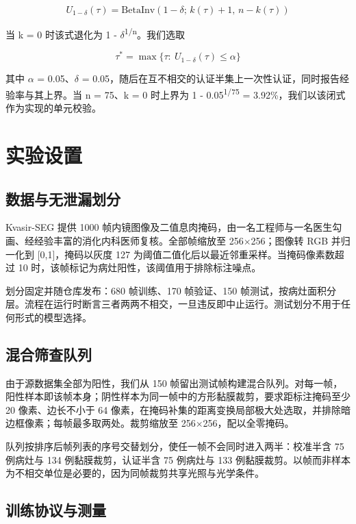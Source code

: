 \documentclass[conference]{IEEEtran}
\begin{document}
\begin{equation}
U_{1-\delta}(\tau)=\mathrm{BetaInv}\!\left(1-\delta;\,k(\tau)+1,\,n-k(\tau)\right)
\end{equation}

当 k = 0 时该式退化为 1 - $\delta$\textsuperscript{1/n}\cite{clopper1934}。我们选取

\begin{equation}
\tau^{*}=\max\{\tau:\ U_{1-\delta}(\tau)\le\alpha\}
\end{equation}

其中 $\alpha$ = 0.05、$\delta$ = 0.05，随后在互不相交的认证半集上一次性认证，同时报告经验率与其上界。当 n = 75、k = 0 时上界为 1 - 0.05\textsuperscript{1/75} = 3.92\%，我们以该闭式作为实现的单元校验。

\section{实验设置}

\subsection{数据与无泄漏划分}

Kvasir-SEG 提供 1000 帧内镜图像及二值息肉掩码，由一名工程师与一名医生勾画、经经验丰富的消化内科医师复核\cite{jha2020kvasir}。全部帧缩放至 256$\times$256；图像转 RGB 并归一化到 [0,1]，掩码以灰度 127 为阈值二值化后以最近邻重采样。当掩码像素数超过 10 时，该帧标记为病灶阳性，该阈值用于排除标注噪点。

划分固定并随仓库发布：680 帧训练、170 帧验证、150 帧测试，按病灶面积分层。流程在运行时断言三者两两不相交，一旦违反即中止运行。测试划分不用于任何形式的模型选择。

\subsection{混合筛查队列}

由于源数据集全部为阳性，我们从 150 帧留出测试帧构建混合队列。对每一帧，阳性样本即该帧本身；阴性样本为同一帧中的方形黏膜裁剪，要求距标注掩码至少 20 像素、边长不小于 64 像素，在掩码补集的距离变换局部极大处选取，并排除暗边框像素；每帧最多取两处。裁剪缩放至 256$\times$256，配以全零掩码。

队列按排序后帧列表的序号交替划分，使任一帧不会同时进入两半：校准半含 75 例病灶与 134 例黏膜裁剪，认证半含 75 例病灶与 133 例黏膜裁剪。以帧而非样本为不相交单位是必要的，因为同帧裁剪共享光照与光学条件。

\subsection{训练协议与测量}
\end{document}
